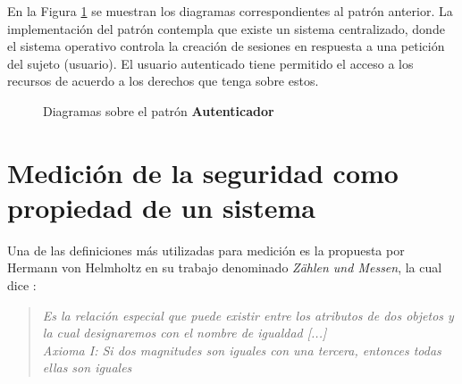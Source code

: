\normalsize

En la Figura \ref{diag_Auth} se muestran los diagramas correspondientes al patrón anterior. La implementación del patrón contempla que existe un sistema centralizado, donde el sistema operativo controla la creación de sesiones en respuesta a una petición del sujeto (usuario). El usuario autenticado tiene permitido el acceso a los recursos de acuerdo a los derechos que tenga sobre estos.

\begin{figure}[h!]
\begin{center}
    \hspace{1cm}
 \caption{Diagramas sobre el patrón \textbf{Autenticador} \cite{Fer13}}
 \label{diag_Auth}
 \end{center}
\end{figure}

\section{Medición de la seguridad como propiedad de un sistema}\label{sec:medicion}

Una de las definiciones más utilizadas para medición es la propuesta por Hermann von Helmholtz en su trabajo denominado \textit{Zählen und Messen}, la cual dice \cite{Hel87}:
\begin{quote}
	\textit{Es la relación especial que puede existir entre los atributos de dos objetos y la cual designaremos con el nombre de igualdad [...]\\
	 Axioma I: Si dos magnitudes son iguales con una tercera, entonces todas ellas son iguales}
\end{quote}

